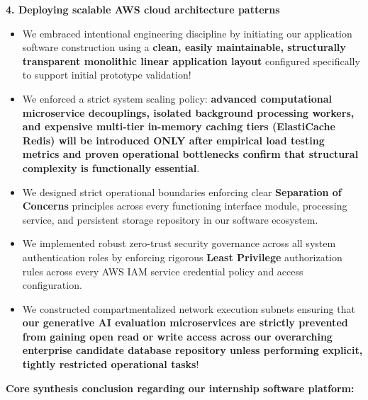 \vspace{0.5em}\noindent\textbf{4. Deploying scalable AWS cloud architecture
patterns}\par

\begin{itemize}
\tightlist
\item
  We embraced intentional engineering discipline by initiating our
  application software construction using a \textbf{clean, easily
  maintainable, structurally transparent monolithic linear application
  layout} configured specifically to support initial prototype
  validation!
\item
  We enforced a strict system scaling policy: \textbf{advanced
  computational microservice decouplings, isolated background processing
  workers, and expensive multi-tier in-memory caching tiers (ElastiCache
  Redis) will be introduced ONLY after empirical load testing metrics
  and proven operational bottlenecks confirm that structural complexity
  is functionally essential}.
\item
  We designed strict operational boundaries enforcing clear
  \textbf{Separation of Concerns} principles across every functioning
  interface module, processing service, and persistent storage
  repository in our software ecosystem.
\item
  We implemented robust zero-trust security governance across all system
  authentication roles by enforcing rigorous \textbf{Least Privilege}
  authorization rules across every AWS IAM service credential policy and
  access configuration.
\item
  We constructed compartmentalized network execution subnets ensuring
  that \textbf{our generative AI evaluation microservices are strictly
  prevented from gaining open read or write access across our
  overarching enterprise candidate database repository unless performing
  explicit, tightly restricted operational tasks}!
\end{itemize}

\vspace{0.5em}\noindent\textbf{Core synthesis conclusion regarding our internship
software
platform:}\par

